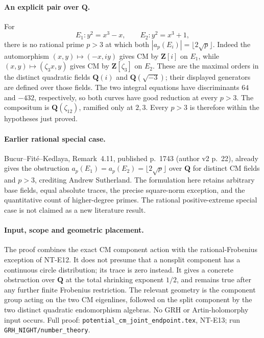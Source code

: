\paragraph{An explicit pair over \(\mathbf Q\).}
For
\[
        E_1:y^2=x^3-x,\qquad E_2:y^2=x^3+1,
                                                               \tag{E13.3}
\]
there is no rational prime \(p>3\) at which both
\(|a_p(E_i)|=\lfloor2\sqrt p\rfloor\).
Indeed the automorphism
\((x,y)\mapsto(-x,iy)\) gives CM by \(\mathbf Z[i]\)
on \(E_1\), while
\((x,y)\mapsto(\zeta_3x,y)\) gives CM by
\(\mathbf Z[\zeta_3]\) on \(E_2\).
These are the maximal orders in the distinct
quadratic fields \(\mathbf Q(i)\) and
\(\mathbf Q(\sqrt{-3})\); their displayed generators
are defined over those fields.
The two integral equations have discriminants
\(64\) and \(-432\), respectively, so both curves
have good reduction at every \(p>3\).
The compositum is \(\mathbf Q(\zeta_{12})\), ramified
only at \(2,3\). Every \(p>3\) is therefore within
the hypotheses just proved.


\paragraph{Earlier rational special case.}
Bucur--Fit\'e--Kedlaya, Remark~4.11, published p.~1743
(author v2 p.~22), already gives the obstruction
$a_p(E_1)=a_p(E_2)=\lfloor2\sqrt p\rfloor$ over
$\mathbf Q$ for distinct CM fields and $p>3$,
crediting Andrew Sutherland. The formulation here
retains arbitrary base fields, equal absolute traces,
the precise square-norm exception, and the quantitative
count of higher-degree primes. The rational positive-extreme
special case is not claimed as a new literature result.

\paragraph{Input, scope and geometric placement.}
The proof combines the exact CM component action with
the rational-Frobenius exception of NT-E12. It does
not presume that a nonsplit component has a continuous
circle distribution; its trace is zero instead.
It gives a concrete obstruction over \(\mathbf Q\)
at the total shrinking exponent \(1/2\), and remains
true after any further finite Frobenius restriction.
The relevant geometry is the component group acting
on the two CM eigenlines, followed on the split
component by the two distinct quadratic endomorphism
algebras. No GRH or Artin-holomorphy input occurs.
Full proof: \texttt{potential\_cm\_joint\_endpoint.tex},
NT-E13; run \texttt{GRH\_NIGHT/number\_theory}.

